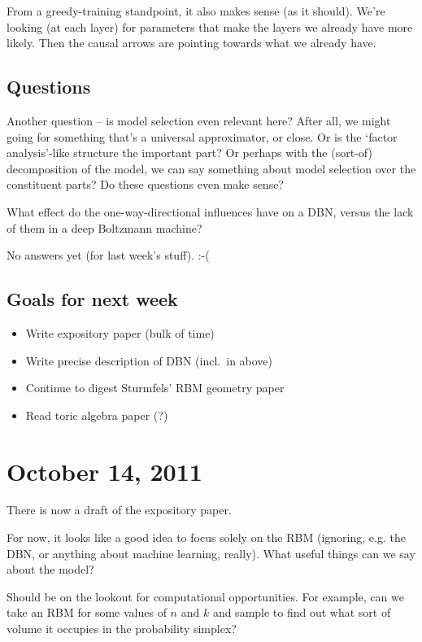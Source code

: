 \documentclass[11pt]{article}
\begin{document}
From a greedy-training standpoint, it also makes sense (as it should).  We're
looking (at each layer) for parameters that make the layers we already have more
likely.  Then the causal arrows are pointing towards what we already have.

\subsection{Questions}

Another question -- is model selection even relevant here?  After all, we might
going for something that's a universal approximator, or close.  Or is the
`factor analysis'-like structure the important part?  Or perhaps with the
(sort-of) decomposition of the model, we can say something about model selection
over the constituent parts?  Do these questions even make sense?

What effect do the one-way-directional influences have on a DBN, versus the lack
of them in a deep Boltzmann machine?

No answers yet (for last week's stuff). :-(


\subsection{Goals for next week}
\begin{itemize}
\item Write expository paper (bulk of time)
\item Write precise description of DBN (incl.\ in above)
\item Continue to digest Sturmfels' RBM geometry paper
\item Read toric algebra paper (?)
\end{itemize}

\section{October 14, 2011}

There is now a draft of the expository paper.

For now, it looks like a good idea to focus solely on the RBM (ignoring, e.g.
the DBN, or anything about machine learning, really).  What useful things can we
say about the model?

Should be on the lookout for computational opportunities.  For example, can we
take an RBM for some values of $n$ and $k$ and sample to find out what sort of
volume it occupies in the probability simplex?  
\end{document}
